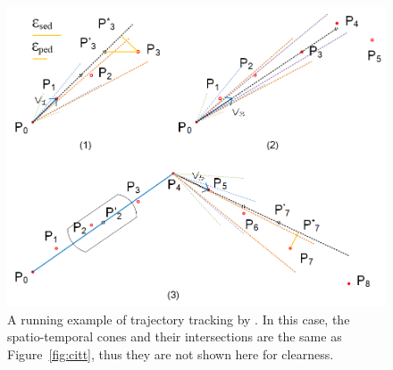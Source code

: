 \begin{figure}[tb!]
	\centering
	\includegraphics[scale=0.88]{figures/Fig-BITT.png}
	\vspace{-2ex}
	\caption{\small A running example of trajectory tracking by \bitt. In this case, the spatio-temporal cones and their intersections are the same as Figure~\ref{fig:citt}, thus they are not shown here for clearness.  }
	\vspace{-2ex}
	\label{fig:bitt}
\end{figure}




